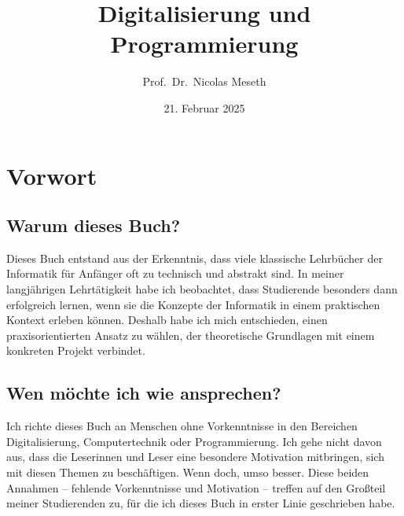 \documentclass[
  letterpaper,
  DIV=11]{scrreprt}
\title{Digitalisierung und Programmierung}
\author{Prof.~Dr.~Nicolas Meseth}
\date{21. Februar 2025}
\renewcommand*\contentsname{Inhaltsverzeichnis}
\newcommand\contentsname{Inhaltsverzeichnis}
\begin{document}
\maketitle

\renewcommand*\contentsname{Inhaltsverzeichnis}
{
\hypersetup{linkcolor=}
\setcounter{tocdepth}{2}
\tableofcontents
}


\chapter*{Vorwort}\label{vorwort}


\section*{Warum dieses Buch?}\label{warum-dieses-buch}


Dieses Buch entstand aus der Erkenntnis, dass viele klassische
Lehrbücher der Informatik für Anfänger oft zu technisch und abstrakt
sind. In meiner langjährigen Lehrtätigkeit habe ich beobachtet, dass
Studierende besonders dann erfolgreich lernen, wenn sie die Konzepte der
Informatik in einem praktischen Kontext erleben können. Deshalb habe ich
mich entschieden, einen praxisorientierten Ansatz zu wählen, der
theoretische Grundlagen mit einem konkreten Projekt verbindet.

\section*{Wen möchte ich wie
ansprechen?}\label{wen-muxf6chte-ich-wie-ansprechen}


Ich richte dieses Buch an Menschen ohne Vorkenntnisse in den Bereichen
Digitalisierung, Computertechnik oder Programmierung. Ich gehe nicht
davon aus, dass die Leserinnen und Leser eine besondere Motivation
mitbringen, sich mit diesen Themen zu beschäftigen. Wenn doch, umso
besser. Diese beiden Annahmen -- fehlende Vorkenntnisse und Motivation
-- treffen auf den Großteil meiner Studierenden zu, für die ich dieses
Buch in erster Linie geschrieben habe.
\end{document}
